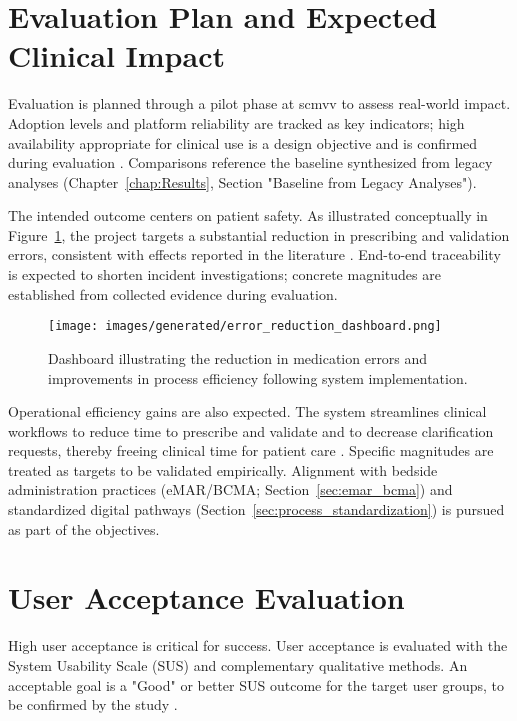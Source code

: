 \section{Evaluation Plan and Expected Clinical Impact}

Evaluation is planned through a pilot phase at \gls{scmvv} to assess real-world impact. Adoption levels and platform reliability are tracked as key indicators; high availability appropriate for clinical use is a design objective and is confirmed during evaluation \cite{nkenyereye2016}. Comparisons reference the baseline synthesized from legacy analyses (Chapter~\ref{chap:Results}, Section "Baseline from Legacy Analyses").

The intended outcome centers on patient safety. As illustrated conceptually in Figure~\ref{fig:error-reduction}, the project targets a substantial reduction in prescribing and validation errors, consistent with effects reported in the literature \cite{radley2013, bates2014}. End-to-end traceability is expected to shorten incident investigations; concrete magnitudes are established from collected evidence during evaluation.

\begin{figure}[htbp]
    \centering
    \texttt{[image: images/generated/error\_reduction\_dashboard.png]}
    \caption{Dashboard illustrating the reduction in medication errors and improvements in process efficiency following system implementation.}
    \label{fig:error-reduction}
\end{figure}

Operational efficiency gains are also expected. The system streamlines clinical workflows to reduce time to prescribe and validate and to decrease clarification requests, thereby freeing clinical time for patient care \cite{austin2018}. Specific magnitudes are treated as targets to be validated empirically. Alignment with bedside administration practices (eMAR/BCMA; Section~\ref{sec:emar_bcma}) and standardized digital pathways (Section~\ref{sec:process_standardization}) is pursued as part of the objectives.

\section{User Acceptance Evaluation}

High user acceptance is critical for success. User acceptance is evaluated with the System Usability Scale (SUS) and complementary qualitative methods. An acceptable goal is a "Good" or better SUS outcome for the target user groups, to be confirmed by the study \cite{lewis2018}.

